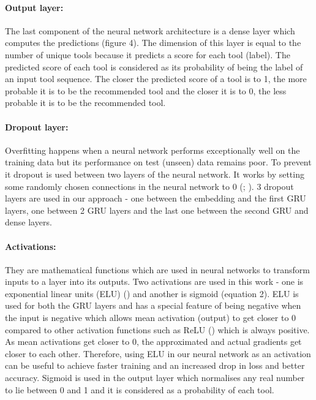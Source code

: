 \documentclass{bioinfo}
\begin{document}
\paragraph*{Output layer:}
The last component of the neural network architecture is a dense layer which computes the predictions (figure 4). The dimension of this layer is equal to the number of unique tools because it predicts a score for each tool (label). The predicted score of each tool is considered as its probability of being the label of an input tool sequence. The closer the predicted score of a tool is to 1, the more probable it is to be the recommended tool and the closer it is to 0, the less probable it is to be the recommended tool.

\paragraph*{Dropout layer:}
Overfitting happens when a neural network performs exceptionally well on the training data but its performance on test (unseen) data remains poor. To prevent it dropout is used between two layers of the neural network. It works by setting some randomly chosen connections in the neural network to 0 (\cite{Zaremba2014RecurrentNN}; \cite{Gal:2016:TGA:3157096.3157211}). 3 dropout layers are used in our approach - one between the embedding and the first GRU layers, one between 2 GRU layers and the last one between the second GRU and dense layers.

\paragraph*{Activations:}
They are mathematical functions which are used in neural networks to transform inputs to a layer into its outputs. Two activations are used in this work - one is exponential linear units (ELU) (\cite{Clevert}) and another is sigmoid (equation 2). ELU is used for both the GRU layers and has a special feature of being negative when the input is negative which allows mean activation (output) to get closer to 0 compared to other activation functions such as ReLU (\cite{NairRLU}) which is always positive. As mean activations get closer to 0, the approximated and actual gradients get closer to each other. Therefore, using ELU in our neural network as an activation can be useful to achieve faster training and an increased drop in loss and better accuracy. Sigmoid is used in the output layer which normalises any real number to lie between 0 and 1 and it is considered as a probability of each tool.
\end{document}
